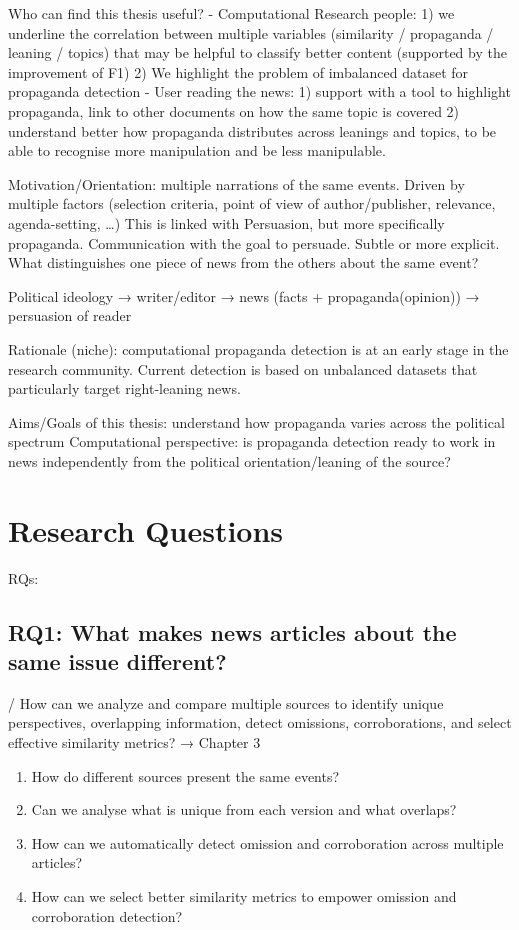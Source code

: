 Who can find this thesis useful?
- Computational Research people:
    1) we underline the correlation between multiple variables (similarity / propaganda / leaning / topics) that may be helpful to classify better content (supported by the improvement of F1)
    2) We highlight the problem of imbalanced dataset for propaganda detection
- User reading the news: 
    1) support with a tool to highlight propaganda, link to other documents on how the same topic is covered
    2) understand better how propaganda distributes across leanings and topics, to be able to recognise more manipulation and be less manipulable.

Motivation/Orientation: multiple narrations of the same events. Driven by multiple factors (selection criteria, point of view of author/publisher, relevance, agenda-setting, …)
This is linked with Persuasion, but more specifically propaganda. Communication with the goal to persuade. Subtle or more explicit.
What distinguishes one piece of news from the others about the same event? 

Political ideology → writer/editor → news (facts + propaganda(opinion)) → persuasion of reader

Rationale (niche): computational propaganda detection is at an early stage in the research community. Current detection is based on unbalanced datasets that particularly target right-leaning news.

Aims/Goals of this thesis: 
understand how propaganda varies across the political spectrum
Computational perspective: is propaganda detection ready to work in news independently from the political orientation/leaning of the source?




\section{Research Questions}
\label{sec:intro_rqs}

RQs:

\subsection{RQ1: What makes news articles about the same issue different?}
/ How can we analyze and compare multiple sources to identify unique perspectives, overlapping information, detect omissions, corroborations, and select effective similarity metrics?
→ Chapter 3
\begin{enumerate}[label={\textbf{RQ1.\arabic*:}},leftmargin=2cm]
    \item How do different sources present the same events?
    \item Can we analyse what is unique from each version and what overlaps? 
    \item How can we automatically detect omission and corroboration across multiple articles?
    \item How can we select better similarity metrics to empower omission and corroboration detection?
\end{enumerate}


